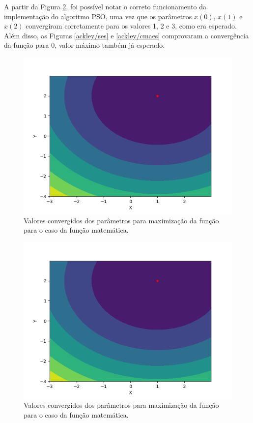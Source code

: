 \documentclass[conference]{IEEEtran}
\begin{document}
A partir da Figura \ref{translated_sphere/cmaes}, foi possível notar o correto funcionamento da implementação do algoritmo PSO, uma vez que os parâmetros $x(0)$, $x(1)$ e $x(2)$ convergiram corretamente para os valores 1, 2 e 3, como era esperado. Além disso, as Figuras \ref{ackley/ses} e \ref{ackley/cmaes} comprovaram a convergência da função para $0$, valor máximo também já esperado.

\begin{figure}[htbp]
\centering
\centerline{\includegraphics[scale=0.4]{imagens/translated_sphere/ses.png}}
\caption{Valores convergidos dos parâmetros para maximização da função para o caso da função matemática.}
\label{translated_sphere/ses}
\end{figure}

\begin{figure}[htbp]
\centering
\centerline{\includegraphics[scale=0.4]{imagens/translated_sphere/cmaes.png}}
\caption{Valores convergidos dos parâmetros para maximização da função para o caso da função matemática.}
\label{translated_sphere/cmaes}
\end{figure}
\end{document}
